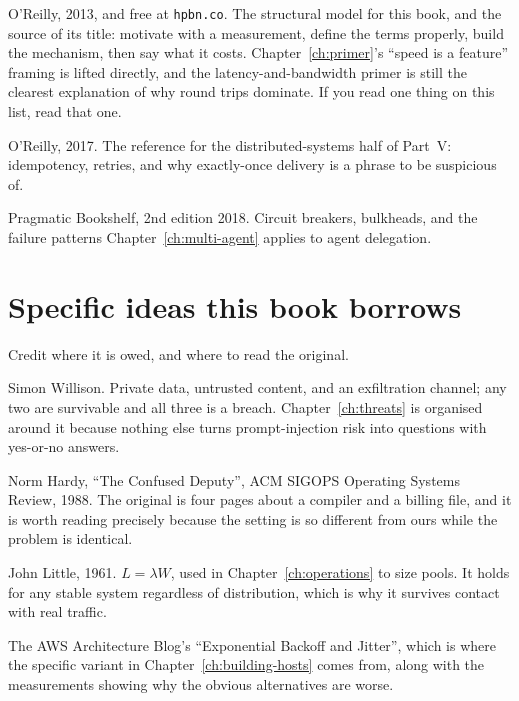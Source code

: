 \begin{description}[leftmargin=1.4em, style=nextline, itemsep=4pt]
\item[\emph{High Performance Browser Networking}, Ilya Grigorik] O'Reilly, 2013,
and free at \texttt{hpbn.co}. The structural model for this book, and the source
of its title: motivate with a measurement, define the terms properly, build the
mechanism, then say what it costs. Chapter~\ref{ch:primer}'s ``speed is a
feature'' framing is lifted directly, and the latency-and-bandwidth primer is
still the clearest explanation of why round trips dominate. If you read one
thing on this list, read that one.
\item[\emph{Designing Data-Intensive Applications}, Martin Kleppmann] O'Reilly,
2017. The reference for the distributed-systems half of Part~V: idempotency,
retries, and why exactly-once delivery is a phrase to be suspicious of.
\item[\emph{Release It!}, Michael Nygard] Pragmatic Bookshelf, 2nd edition 2018.
Circuit breakers, bulkheads, and the failure patterns Chapter~\ref{ch:multi-agent}
applies to agent delegation.
\end{description}

\section{Specific ideas this book borrows}

Credit where it is owed, and where to read the original.

\begin{description}[leftmargin=1.4em, style=nextline, itemsep=4pt]
\item[The lethal trifecta] Simon Willison. Private data, untrusted content, and
an exfiltration channel; any two are survivable and all three is a breach.
Chapter~\ref{ch:threats} is organised around it because nothing else turns
prompt-injection risk into questions with yes-or-no answers.
\item[The confused deputy] Norm Hardy, ``The Confused Deputy'', ACM SIGOPS
Operating Systems Review, 1988. The original is four pages about a compiler and
a billing file, and it is worth reading precisely because the setting is so
different from ours while the problem is identical.
\item[Little's Law] John Little, 1961. $L = \lambda W$, used in
Chapter~\ref{ch:operations} to size pools. It holds for any stable system
regardless of distribution, which is why it survives contact with real traffic.
\item[Full jitter] The AWS Architecture Blog's ``Exponential Backoff and
Jitter'', which is where the specific variant in Chapter~\ref{ch:building-hosts}
comes from, along with the measurements showing why the obvious alternatives are
worse.
\end{description}

